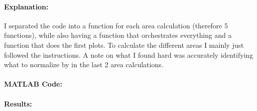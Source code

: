 
\paragraph{Explanation:}
I separated the code into a function for each area calculation
(therefore 5 functions), while also having a  function
that orchestrates everything and a  function that does
the first plots.
To calculate the different areas I mainly just followed the instructions.
A note on what I found hard was accurately identifying what to
normalize by in the last 2 area calculations.

\paragraph{MATLAB Code:}

\begin{tiny}
    
\end{tiny}

\paragraph{Results:}

